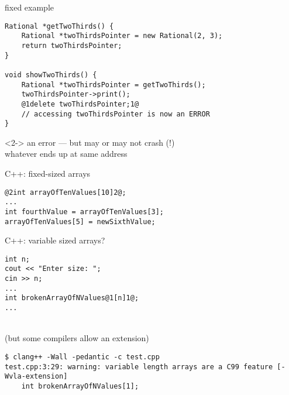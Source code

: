\begin{frame}[fragile,label=cppNewDelete3]{fixed example}
\begin{lstlisting}
Rational *getTwoThirds() {
    Rational *twoThirdsPointer = new Rational(2, 3);
    return twoThirdsPointer;
}

void showTwoThirds() {
    Rational *twoThirdsPointer = getTwoThirds();
    twoThirdsPointer->print();
    @1delete twoThirdsPointer;1@
    // accessing twoThirdsPointer is now an ERROR
}
\end{lstlisting}
\begin{visibleenv}<2->
an error --- but may or may not crash (!) \\
whatever ends up at same address
\end{visibleenv}
\end{frame}


\begin{frame}[fragile,label=cppArray]{C++: fixed-sized arrays}
\begin{lstlisting}
@2int arrayOfTenValues[10]2@;
...
int fourthValue = arrayOfTenValues[3];
arrayOfTenValues[5] = newSixthValue;
\end{lstlisting}
\end{frame}

\begin{frame}[fragile,label=vlas]{C++: variable sized arrays?}
\begin{lstlisting}
int n;
cout << "Enter size: ";
cin >> n;
...
int brokenArrayOfNValues@1[n]1@;
...
\end{lstlisting}
 \\
(but some compilers allow an extension)
\begin{Verbatim}[fontsize=\small]
$ clang++ -Wall -pedantic -c test.cpp
test.cpp:3:29: warning: variable length arrays are a C99 feature [-Wvla-extension]
    int brokenArrayOfNValues[1];
\end{Verbatim}
\end{frame}


